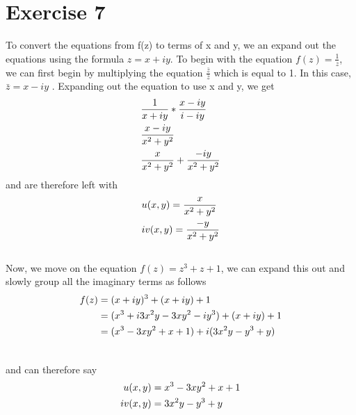 \documentclass[notitlepage]{article}
\begin{document}
\section*{Exercise 7}
    
    \hspace{1cm} To convert the equations from f(z) to terms of x and y, we an expand out the equations
    using the formula $z=x+iy$. To begin with the equation $f(z) = \frac{1}{z}$, we can first begin by 
    multiplying the equation $\frac{\bar{z}}{\bar{z}}$ which is equal to 1. In this case, $\bar{z} = x-iy$
    . Expanding out the equation to use x and y, we get
    \begin{equation}
        \begin{split}
            & \frac{1}{x+iy}*{\frac{x-iy}{i-iy}} \\
            & \frac{x-iy}{x^2+y^2} \\
            & \frac{x}{x^2+y^2}+\frac{-iy}{x^2+y^2} \notag
        \end{split}
    \end{equation}
and are therefore left with
\begin{equation}
    \begin{split}
        & u(x,y) = \frac{x}{x^2+y^2} \\
        & iv(x,y)= \frac{-y}{x^2+y^2} \notag
    \end{split}
\end{equation}\\

    Now, we move on the equation $f(z)=z^3+z+1$, we can expand this out and slowly group all the imaginary
    terms as follows
\begin{equation}
    \begin{split}
        f(z)&= (x+iy)^3 + (x+iy) + 1  \\
        &= (x^3+i3x^2y-3xy^2-iy^3)+(x+iy)+1\\
        &= (x^3-3xy^2+x+1)+i(3x^2y-y^3+y) \\
         \notag
    \end{split}
\end{equation}

and can therefore say
\begin{equation}
    \begin{split}
         \notag
        u(x,y)  &= x^3-3xy^2+x+1  \\
        iv(x,y) &=3x^2y-y^3+y \\
     \end{split}
\end{equation} \\~\\
\end{document}
